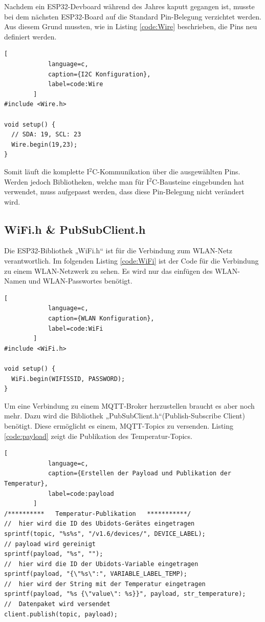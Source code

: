         Nachdem ein ESP32-Devboard während des Jahres kaputt gegangen ist, musste bei dem nächsten ESP32-Board auf die Standard Pin-Belegung verzichtet werden. Aus diesem Grund mussten, wie in Listing \ref{code:Wire} beschrieben, die Pins neu definiert werden. 
        \begin{lstlisting}[
            language=c,
            caption={I2C Konfiguration},
            label=code:Wire
        ]
#include <Wire.h>

void setup() {
  // SDA: 19, SCL: 23
  Wire.begin(19,23); 
}
        \end{lstlisting}
        
        Somit läuft die komplette I$^2$C-Kommunikation über die ausgewählten Pins. Werden jedoch Bibliotheken, welche man für I$^2$C-Bausteine eingebunden hat verwendet, muss aufgepasst werden, dass diese Pin-Belegung nicht verändert wird. 
        
\pagebreak
    
    \subsection{WiFi.h \& PubSubClient.h}
        
        Die ESP32-Bibliothek „WiFi.h“ ist für die Verbindung zum WLAN-Netz verantwortlich. Im folgenden Listing \ref{code:WiFi} ist der Code für die Verbindung zu einem WLAN-Netzwerk zu sehen. Es wird nur das einfügen des WLAN-Namen und WLAN-Passwortes benötigt.
        
        \begin{lstlisting}[
            language=c,
            caption={WLAN Konfiguration},
            label=code:WiFi
        ]
#include <WiFi.h>

void setup() {
  WiFi.begin(WIFISSID, PASSWORD); 
}
        \end{lstlisting}
        
        Um eine Verbindung zu einem MQTT-Broker herzustellen braucht es aber noch mehr. Dazu wird die Bibliothek „PubSubClient.h“(Publish-Subscribe Client) benötigt. Diese ermöglicht es einem, MQTT-Topics zu versenden. Listing \ref{code:payload} zeigt die Publikation des Temperatur-Topics.
        
        \begin{lstlisting}[
            language=c,
            caption={Erstellen der Payload und Publikation der Temperatur},
            label=code:payload
        ]
/**********   Temperatur-Publikation   ***********/
//  hier wird die ID des Ubidots-Gerätes eingetragen
sprintf(topic, "%s%s", "/v1.6/devices/", DEVICE_LABEL);
// payload wird gereinigt
sprintf(payload, "%s", ""); 
//  hier wird die ID der Ubidots-Variable eingetragen
sprintf(payload, "{\"%s\":", VARIABLE_LABEL_TEMP);
//  hier wird der String mit der Temperatur eingetragen
sprintf(payload, "%s {\"value\": %s}}", payload, str_temperature);
//  Datenpaket wird versendet
client.publish(topic, payload);
        \end{lstlisting}
        
